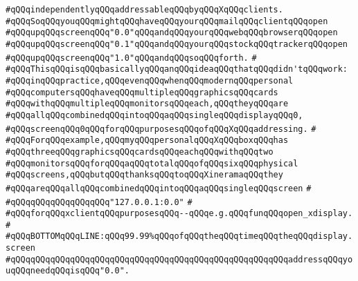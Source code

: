 \verb|#qQQqindependentlyqQQqaddressableqQQqbyqQQqXqQQqclients.|\newline
\verb|#qQQqSoqQQqyouqQQqmightqQQqhaveqQQqyourqQQqmailqQQqclientqQQqopen|\newline
\verb|#qQQqupqQQqscreenqQQq"0.0"qQQqandqQQqyourqQQqwebqQQqbrowserqQQqopen|\newline
\verb|#qQQqupqQQqscreenqQQq"0.1"qQQqandqQQqyourqQQqstockqQQqtrackerqQQqopen|\newline
\verb|#qQQqupqQQqscreenqQQq"1.0"qQQqandqQQqsoqQQqforth.|\newline
\verb|#|\newline
\verb|#qQQqThisqQQqisqQQqbasicallyqQQqanqQQqideaqQQqthatqQQqdidn'tqQQqwork:|\newline
\verb|#qQQqinqQQqpractice,qQQqevenqQQqwhenqQQqmodernqQQqpersonal|\newline
\verb|#qQQqcomputersqQQqhaveqQQqmultipleqQQqgraphicsqQQqcards|\newline
\verb|#qQQqwithqQQqmultipleqQQqmonitorsqQQqeach,qQQqtheyqQQqare|\newline
\verb|#qQQqallqQQqcombinedqQQqintoqQQqaqQQqsingleqQQqdisplayqQQq0,|\newline
\verb|#qQQqscreenqQQq0qQQqforqQQqpurposesqQQqofqQQqXqQQqaddressing.|\newline
\verb|#|\newline
\verb|#qQQqForqQQqexample,qQQqmyqQQqpersonalqQQqXqQQqboxqQQqhas|\newline
\verb|#qQQqthreeqQQqgraphicsqQQqcardsqQQqeachqQQqwithqQQqtwo|\newline
\verb|#qQQqmonitorsqQQqforqQQqaqQQqtotalqQQqofqQQqsixqQQqphysical|\newline
\verb|#qQQqscreens,qQQqbutqQQqthanksqQQqtoqQQqXineramaqQQqthey|\newline
\verb|#qQQqareqQQqallqQQqcombinedqQQqintoqQQqaqQQqsingleqQQqscreen|\newline
\verb|#|\newline
\verb|#qQQqqQQqqQQqqQQqqQQq"127.0.0.1:0.0"|\newline
\verb|#|\newline
\verb|#qQQqforqQQqxclientqQQqpurposesqQQq--qQQqe.g.qQQqfunqQQqopen_xdisplay.|\newline
\verb|#|\newline
\verb|#qQQqBOTTOMqQQqLINE:qQQq99.99%qQQqofqQQqtheqQQqtimeqQQqtheqQQqdisplay.screen|\newline
\verb|#qQQqqQQqqQQqqQQqqQQqqQQqqQQqqQQqqQQqqQQqqQQqqQQqqQQqqQQqaddressqQQqyouqQQqneedqQQqisqQQq"0.0".|\newline
